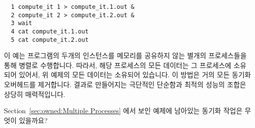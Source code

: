 \vspace{5pt}
\begin{minipage}[t]{\columnwidth}
\scriptsize
\begin{verbatim}
  1 compute_it 1 > compute_it.1.out &
  2 compute_it 2 > compute_it.2.out &
  3 wait
  4 cat compute_it.1.out
  5 cat compute_it.2.out
\end{verbatim}
\end{minipage}
\vspace{5pt}

이 예는  프로그램의 두개의 인스턴스를 메모리를 공유하지 않는
별개의 프로세스들을 통해 병렬로 수행합니다.
따라서, 해당 프로세스의 모든 데이터는 그 프로세스에 소유되어 있어서, 위 예제의
모든 데이터는 소유되어 있습니다.
이 방법은 거의 모든 동기화 오버헤드를 제거합니다.
결과로 만들어지는 극단적인 단순함과 최적의 성능의 조합은 상당히 매력적입니다.
\iffalse

This example runs two instances of the \co{compute_it} program in
parallel, as separate processes that do not share memory.
Therefore, all data in a given process is owned by that process,
so that almost the entirety of data in the above example is owned.
This approach almost entirely eliminates synchronization overhead.
The resulting combination of extreme simplicity and optimal performance
is obviously quite attractive.
\fi

\QuickQuiz{}
	Section~\ref{sec:owned:Multiple Processes} 에서 보인 예제에 남아있는
	동기화 작업은 무엇이 있을까요?
	\iffalse

